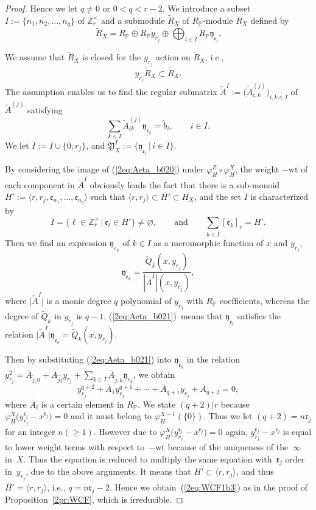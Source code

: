 \documentclass[10pt,a4paper]{amsart}
\def\ZZ{{\mathbb Z}}
\def\PP{{\mathbb P}}
\def\fY{{\mathfrak Y}}
\def\fe{{\mathfrak e}}
\def\fr{{\mathfrak r}}
\def\fy{{\mathfrak y}}
\def\tA{{\widetilde A}}
\def\tR{{\widetilde R}}
\def\tQ{{\widetilde Q}}
\def\tR{{\widetilde R}}
\def\tb{{\widetilde b}}
\def\tj{{\widetilde j}}
\def\BA{{\overline A}}
\def\BI{{\overline I}}
\def\Bfr{{\overline{\mathfrak r}}}
\def\wt{{\mathrm {wt}}}
\numberwithin{equation}{section}
\begin{document}
\begin{proof}
Hence we let $q\neq0$ or $0<q<r-2$.
We introduce a subset $I:=\{n_1, n_2, \dots, n_q\}$ of $\ZZ_r^\times$ and a submodule $\tR_X$ of $R_\PP$-module $R_X$ defined by
\[
\tR_X=R_\PP \oplus R_\PP y_{r_j}\oplus\bigoplus_{i \in I}R_\PP \fy_{\fe_i}.
\]

We assume that $\tR_X$ is closed for the $y_{r_j}$ action on $\tR_X$, i.e.,
\begin{equation}
y_{r_j}\tR_X\subset \tR_X.\label{2eq:Aeta_b03}
\end{equation}
The assumption enables us to find the regular submatrix $\tA^{I}:=\big(\tA^{(j)}_{i,k}\big)_{i, k\in I}$ of $\tA^{(j)}$ satisfying
\begin{equation}
\sum_{k \in I} \tA^{(j)}_{i k}\fy_{\fe_k} =\tb_i, \qquad i \in I.\label{2eq:Aeta_b020}
\end{equation}
We let $\BI:=I\cup\{0,r_j\}$, and $\fY_X^\BI:=\big\{ \fy_{\fe_i}\, |\,i \in \BI\big\}$.

By considering the image of (\ref{2eq:Aeta_b020}) under $\varphi_H^Z\circ\varphi_H^X$, the weight $-\wt$ of each component in $\tA^I$ obviously leads the fact that there is a sub-monoid $H':=\langle r, r_j, \fe_{n_1}, \dots, \fe_{n_q}\rangle$ such that $\langle r, r_j\rangle \subset H' \subset H_X$, and the set $\BI$ is characterized by
\begin{equation}
\BI = \{\ell \in \ZZ_r^\times \, |\,\fe_{\ell}\in H'\}\neq \varnothing, \qquad\text{and}\qquad
 \sum_{k\in \BI} [\fe_{k}]_r = H'.\label{2eq:Aeta_b022}
\end{equation}
Then we find an expression $\fy_{e_{k}}$ of $k \in I$ as a meromorphic function of $x$ and $y_{r_j}$,
\begin{equation}
\fy_{\fe_{k}}= \frac{\tQ_k(x, y_{r_j}) } {|\tA^{I}|(x, y_{r_j})},\label{2eq:Aeta_b021}
\end{equation}
where $\big|\tA^{I}\big|$ is a monic degree $q$ polynomial of $y_{r_j}$ with $R_\PP$ coefficients, whereas the degree of $\tQ_k$ in $y_{r_j}$ is $q-1$.
(\ref{2eq:Aeta_b021})~means that $\fy_{\fe_{\ell}}$ satisfies the relation $\big|\tA^{I}\big|\fy_{\fe_{k}}=\tQ_k(x, y_{r_j})$.

Then by substituting (\ref{2eq:Aeta_b021}) into $\fy_{\fe_{k}}$ in the relation
$y_{r_j}^2= \BA_{\tj,0}+\BA_{\tj\tj}y_{r_j}+ \sum_{k\in I} \BA_{\tj,k} \fy_{e_k}$, we obtain
\[
y_{r_j}^{q+2} + \BA_{1}y_{r_j}^{q+1}+\cdots+ \BA_{q+1}y_{r_j}+\BA_{q+2}=0,
\]
where $\BA_i$ is a certain element in $R_\PP$.
We state $(q+2)|r$ because $\varphi_H^X\big(y_{r_j}^{\fr_j}-x^{\Bfr_j}\big)=0$ and it must belong to $\varphi_H^{X-1}(\{0\})$. Thus we let $(q+2) = n\fr_j$ for an integer $n(\ge 1)$. However due to $\varphi_H^X\big(y_{r_j}^{\fr_j}-x^{\Bfr_j}\big)=0$ again, $y_{r_j}^{\fr_j}-x^{\Bfr_j}$ is equal to lower weight terms with respect to~$-\wt$ because of the uniqueness of the~$\infty$ in~$X$.
Thus the equation is reduced to multiply the same equation with~$\fr_j$ order in~$y_{r_j}$, due to the above arguments.
It means that $H'\subset \langle r, r_j\rangle$, and thus $H'=\langle r, r_j\rangle$, i.e., $q=n\fr_j-2$.
Hence we obtain~(\ref{2eq:WCF1b3}) as in the proof of Proposition~\ref{2pr:WCF}, which is irreducible.


\end{proof}
\end{document}
